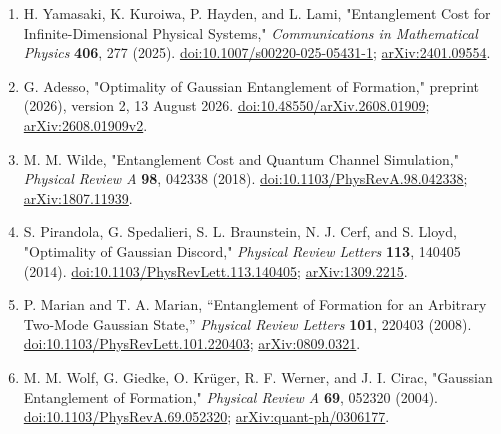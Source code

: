 \begin{enumerate}[label={},leftmargin=4.8em,labelsep=0.5em]
  \footnotesize
  \item[\textup{[YKHL25]}]\label{ref:ser12-1}
  H. Yamasaki, K. Kuroiwa, P. Hayden, and L. Lami, "Entanglement Cost for Infinite-Dimensional Physical Systems," \emph{Communications in Mathematical Physics} \textbf{406}, 277 (2025). \href{https://doi.org/10.1007/s00220-025-05431-1}{doi:10.1007/s00220-025-05431-1}; \href{https://arxiv.org/abs/2401.09554}{arXiv:2401.09554}.

  \item[\textup{[Ade26]}]\label{ref:ser12-2}
  G. Adesso, "Optimality of Gaussian Entanglement of Formation," preprint (2026), version 2, 13 August 2026. \href{https://doi.org/10.48550/arXiv.2608.01909}{doi:10.48550/arXiv.2608.01909}; \href{https://arxiv.org/abs/2608.01909v2}{arXiv:2608.01909v2}.

  \item[\textup{[Wil18]}]\label{ref:ser12-3}
  M. M. Wilde, "Entanglement Cost and Quantum Channel Simulation," \emph{Physical Review A} \textbf{98}, 042338 (2018). \href{https://doi.org/10.1103/PhysRevA.98.042338}{doi:10.1103/PhysRevA.98.042338}; \href{https://arxiv.org/abs/1807.11939}{arXiv:1807.11939}.

  \item[\textup{[PSBCL14]}]\label{ref:ser12-discord}
  S. Pirandola, G. Spedalieri, S. L. Braunstein, N. J. Cerf, and S. Lloyd, "Optimality of Gaussian Discord," \emph{Physical Review Letters} \textbf{113}, 140405 (2014). \href{https://doi.org/10.1103/PhysRevLett.113.140405}{doi:10.1103/PhysRevLett.113.140405}; \href{https://arxiv.org/abs/1309.2215}{arXiv:1309.2215}.

  \item[\textup{[MM08]}]\label{ref:ser12-marian}
  P. Marian and T. A. Marian, ``Entanglement of Formation for an Arbitrary Two-Mode Gaussian State,'' \emph{Physical Review Letters} \textbf{101}, 220403 (2008). \href{https://doi.org/10.1103/PhysRevLett.101.220403}{doi:10.1103/PhysRevLett.101.220403}; \href{https://arxiv.org/abs/0809.0321}{arXiv:0809.0321}.

  \item[\textup{[WGKWC04]}]\label{ref:ser12-wolf}
  M. M. Wolf, G. Giedke, O. Kr\"uger, R. F. Werner, and J. I. Cirac, "Gaussian Entanglement of Formation," \emph{Physical Review A} \textbf{69}, 052320 (2004). \href{https://doi.org/10.1103/PhysRevA.69.052320}{doi:10.1103/PhysRevA.69.052320}; \href{https://arxiv.org/abs/quant-ph/0306177}{arXiv:quant-ph/0306177}.
\end{enumerate}

